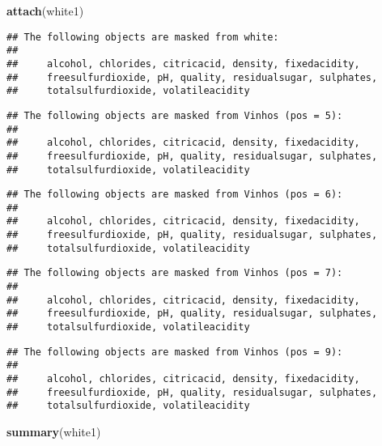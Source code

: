 \documentclass[]{article}
\newenvironment{Shaded}{\begin{snugshade}}{\end{snugshade}}
\newcommand{\KeywordTok}[1]{\textcolor[rgb]{0.13,0.29,0.53}{\textbf{#1}}}
\newcommand{\NormalTok}[1]{#1}
\begin{document}
\begin{Shaded}
\begin{Highlighting}[]
\KeywordTok{attach}\NormalTok{(white1)}
\end{Highlighting}
\end{Shaded}

\begin{verbatim}
## The following objects are masked from white:
## 
##     alcohol, chlorides, citricacid, density, fixedacidity,
##     freesulfurdioxide, pH, quality, residualsugar, sulphates,
##     totalsulfurdioxide, volatileacidity
\end{verbatim}

\begin{verbatim}
## The following objects are masked from Vinhos (pos = 5):
## 
##     alcohol, chlorides, citricacid, density, fixedacidity,
##     freesulfurdioxide, pH, quality, residualsugar, sulphates,
##     totalsulfurdioxide, volatileacidity
\end{verbatim}

\begin{verbatim}
## The following objects are masked from Vinhos (pos = 6):
## 
##     alcohol, chlorides, citricacid, density, fixedacidity,
##     freesulfurdioxide, pH, quality, residualsugar, sulphates,
##     totalsulfurdioxide, volatileacidity
\end{verbatim}

\begin{verbatim}
## The following objects are masked from Vinhos (pos = 7):
## 
##     alcohol, chlorides, citricacid, density, fixedacidity,
##     freesulfurdioxide, pH, quality, residualsugar, sulphates,
##     totalsulfurdioxide, volatileacidity
\end{verbatim}

\begin{verbatim}
## The following objects are masked from Vinhos (pos = 9):
## 
##     alcohol, chlorides, citricacid, density, fixedacidity,
##     freesulfurdioxide, pH, quality, residualsugar, sulphates,
##     totalsulfurdioxide, volatileacidity
\end{verbatim}

\begin{Shaded}
\begin{Highlighting}[]
\KeywordTok{summary}\NormalTok{(white1)}
\end{Highlighting}
\end{Shaded}
\end{document}
